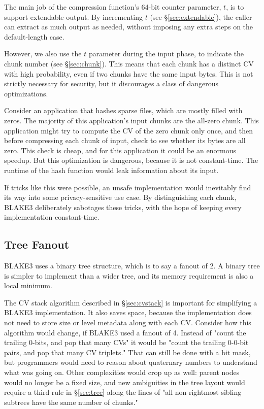 \documentclass[11pt,notitlepage,a4paper]{article}
\begin{document}
The main job of the compression function's 64-bit counter parameter, $t$, is to
support extendable output. By incrementing $t$ (see \S\ref{sec:extendable}),
the caller can extract as much output as needed, without imposing any extra
steps on the default-length case.

However, we also use the $t$ parameter during the input phase, to indicate the
chunk number (see \S\ref{sec:chunk}). This means that each chunk has a distinct
CV with high probability, even if two chunks have the same input bytes. This is
not strictly necessary for security, but it discourages a class of dangerous
optimizations.

Consider an application that hashes sparse files, which are mostly filled with
zeros. The majority of this application's input chunks are the all-zero chunk.
This application might try to compute the CV of the zero chunk only once, and
then before compressing each chunk of input, check to see whether its bytes are
all zero. This check is cheap, and for this application it could be an enormous
speedup. But this optimization is dangerous, because it is not constant-time.
The runtime of the hash function would leak information about its input.

If tricks like this were possible, an unsafe implementation would inevitably
find its way into some privacy-sensitive use case. By distinguishing each
chunk, BLAKE3 deliberately sabotages these tricks, with the hope of keeping
every implementation constant-time.

\subsection{Tree Fanout}\label{sec:treefanout}

BLAKE3 uses a binary tree structure, which is to say a fanout of 2. A binary
tree is simpler to implement than a wider tree, and its memory requirement is
also a local minimum.

The CV stack algorithm described in \S\ref{sec:cvstack} is important for
simplifying a BLAKE3 implementation. It also saves space, because the
implementation does not need to store size or level metadata along with each
CV. Consider how this algorithm would change, if BLAKE3 used a fanout of 4.
Instead of "count the trailing 0-bits, and pop that many CVs" it would be
"count the trailing 0-0-bit pairs, and pop that many CV triplets." That can
still be done with a bit mask, but programmers would need to reason about
quaternary numbers to understand what was going on. Other complexities would
crop up as well: parent nodes would no longer be a fixed size, and new
ambiguities in the tree layout would require a third rule in \S\ref{sec:tree}
along the lines of "all non-rightmost sibling subtrees have the same number of
chunks."
\end{document}
